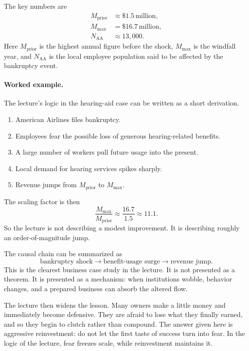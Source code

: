 The key numbers are
\begin{align}
M_{\text{prior}} &\approx \$1.5\,\text{million},\\
M_{\max} &= \$16.7\,\text{million},\\
N_{\text{AA}} &\approx 13{,}000.
\end{align}
Here \(M_{\text{prior}}\) is the highest annual figure before the shock, \(M_{\max}\) is the windfall year, and \(N_{\text{AA}}\) is the local employee population said to be affected by the bankruptcy event.

\paragraph{Worked example.} The lecture's logic in the hearing-aid case can be written as a short derivation.
\begin{enumerate}
\item American Airlines files bankruptcy.
\item Employees fear the possible loss of generous hearing-related benefits.
\item A large number of workers pull future usage into the present.
\item Local demand for hearing services spikes sharply.
\item Revenue jumps from \(M_{\text{prior}}\) to \(M_{\max}\).
\end{enumerate}

The scaling factor is then
\begin{equation}
\frac{M_{\max}}{M_{\text{prior}}}
\approx
\frac{16.7}{1.5}
\approx
11.1.
\end{equation}
So the lecture is not describing a modest improvement. It is describing roughly an order-of-magnitude jump.

The causal chain can be summarized as
\begin{equation}
\text{bankruptcy shock} \rightarrow \text{benefit-usage surge} \rightarrow \text{revenue jump}.
\end{equation}
This is the clearest business case study in the lecture. It is not presented as a theorem. It is presented as a mechanism: when institutions wobble, behavior changes, and a prepared business can absorb the altered flow.

The lecture then widens the lesson. Many owners make a little money and immediately become defensive. They are afraid to lose what they finally earned, and so they begin to clutch rather than compound. The answer given here is aggressive reinvestment: do not let the first taste of success turn into fear. In the logic of the lecture, fear freezes scale, while reinvestment maintains it.

